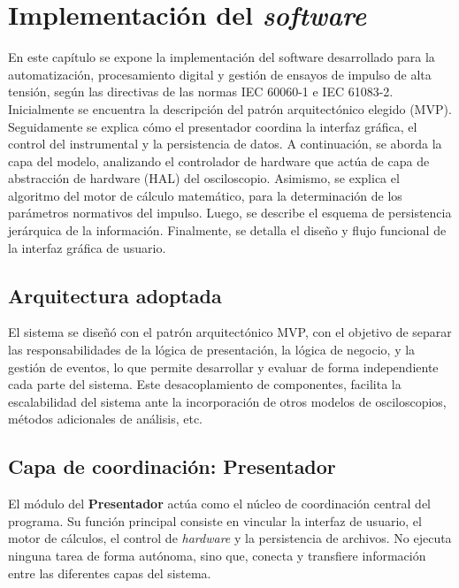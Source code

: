 \newpage
\chapter{Implementación del \emph{software}}
\vspace{3\baselineskip}

En este capítulo se expone la implementación del software desarrollado para la automatización, procesamiento digital y gestión de ensayos de impulso de alta tensión, según las directivas de las normas IEC 60060-1 e IEC 61083-2. Inicialmente se encuentra la descripción del patrón arquitectónico elegido (MVP). Seguidamente se explica cómo el presentador coordina la interfaz gráfica, el control del instrumental y la persistencia de datos. A continuación, se aborda la capa del modelo, analizando el controlador de hardware que actúa de capa de abstracción de hardware (HAL) del osciloscopio. Asimismo, se explica el algoritmo del motor de cálculo matemático, para la determinación de los parámetros normativos del impulso. Luego, se describe el esquema de persistencia jerárquica de la información. Finalmente, se detalla el diseño y flujo funcional de la interfaz gráfica de usuario.

\section{Arquitectura adoptada}
\label{sec:arquitectura_adoptada}

El sistema se diseñó con el patrón arquitectónico MVP, con el objetivo de separar las responsabilidades de la lógica de presentación, la lógica de negocio, y la gestión de eventos, lo que permite desarrollar y evaluar de forma independiente cada parte del sistema. Este desacoplamiento de componentes, facilita la escalabilidad del sistema ante la incorporación de otros modelos de osciloscopios, métodos adicionales de análisis, etc.

\section{Capa de coordinación: Presentador}
\label{sec:capa_presentador}

El módulo del \textbf{Presentador} actúa como el núcleo de coordinación central del programa. Su función principal consiste en vincular la interfaz de usuario, el motor de cálculos, el control de \emph{hardware} y la persistencia de archivos. No ejecuta ninguna tarea de forma autónoma, sino que, conecta y transfiere información entre las diferentes capas del sistema.

